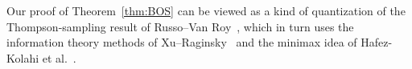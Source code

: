 \documentclass[10pt]{article}
\begin{document}
\noindent Our proof of Theorem~\eqref{thm:BOS} can be viewed as a kind of quantization of the Thompson-sampling result of Russo--Van{ }Roy~\cite{russo2016information}, which in turn uses the information theory methods of Xu--Raginsky~\cite{xu2022minimum} and the minimax idea of Hafez-Kolahi et al.~\cite{hafezkolahi2023minimax}.
\end{document}
